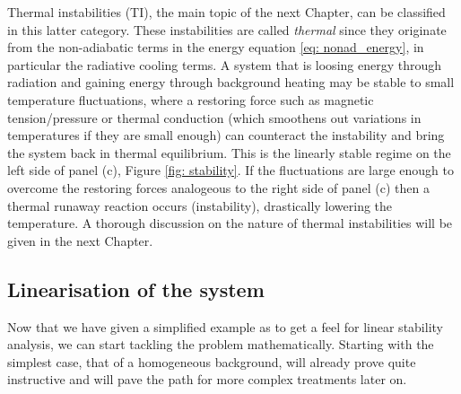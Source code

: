 Thermal instabilities (\gls{TI}), the main topic of the next Chapter, can be classified in this latter category. These instabilities are called \emph{thermal} since they originate from the non-adiabatic terms in the energy equation \eqref{eq: nonad_energy}, in particular the radiative cooling terms. A system that is loosing energy through radiation and gaining energy through background heating may be stable to small temperature fluctuations, where a restoring force such as magnetic tension/pressure or thermal conduction (which smoothens out variations in temperatures if they are small enough) can counteract the instability and bring the system back in thermal equilibrium. This is the linearly stable regime on the left side of panel (c), Figure \ref{fig: stability}. If the fluctuations are large enough to overcome the restoring forces analogeous to the right side of panel (c) then a thermal runaway reaction occurs (instability), drastically lowering the temperature. A thorough discussion on the nature of thermal instabilities will be given in the next Chapter.

\subsection{Linearisation of the system}
Now that we have given a simplified example as to get a feel for linear stability analysis, we can start tackling the problem mathematically. Starting with the simplest case, that of a homogeneous background, will already prove quite instructive and will pave the path for more complex treatments later on.

